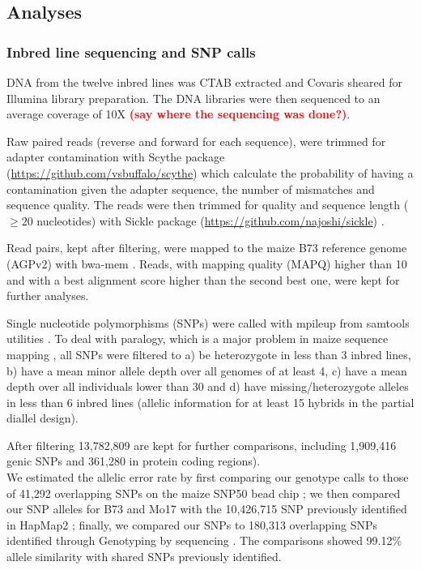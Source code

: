 \documentclass[10pt]{article}
\newcommand{\sme}[1]{\textcolor{red}{\bf #1}}
\begin{document}
\subsection*{Analyses}

\subsubsection*{Inbred line sequencing and SNP calls}

DNA from the twelve inbred lines was CTAB extracted \citep{Doyle1987} and Covaris sheared for Illumina library preparation. The DNA libraries were then sequenced to an average coverage of 10X \sme{(say where the sequencing was done?)}.

Raw paired reads (reverse and forward for each sequence), were trimmed for adapter contamination with Scythe package (\url{https://github.com/vsbuffalo/scythe}) which calculate the probability of having a contamination given the adapter sequence, the number of mismatches and sequence quality. The reads were then trimmed for quality and sequence length ($\geq 20$ nucleotides) with Sickle package (\url{https://github.com/najoshi/sickle}) .

Read pairs, kept after filtering,  were mapped to the maize B73 reference genome (AGPv2) with bwa-mem \citep{Li2009B}. Reads, with mapping quality (MAPQ) higher than 10 and with a best alignment score higher than the second best one, were kept for further analyses.

Single nucleotide polymorphisms (SNPs) were called with mpileup from samtools utilities \citep{Li2009}. To deal with paralogy, which is a major problem in maize sequence mapping \citep{Chia2012}, all SNPs were filtered to a) be heterozygote in less than 3 inbred lines, b) have a mean minor allele depth over all genomes of at least 4, c) have a mean depth over all individuals lower than 30 and d) have missing/heterozygote alleles in less than 6 inbred lines (allelic information for at least 15 hybrids in the partial diallel design). 

After filtering 13,782,809 are kept for further comparisons, including 1,909,416 genic SNPs and 361,280 in protein coding regions). \\
We estimated the allelic error rate by first comparing our genotype calls to those of 41,292 overlapping SNPs on the maize SNP50 bead chip \citep{Heerwaarden2012};  we then compared our SNP alleles for B73 and Mo17 with the 10,426,715 SNP previously identified in HapMap2 \citep{Chia2012}; finally, we compared our SNPs to 180,313 overlapping SNPs identified through Genotyping by sequencing \citep{Romay2013}. The comparisons showed 99.12\% allele similarity with shared SNPs previously identified. 
\end{document}
